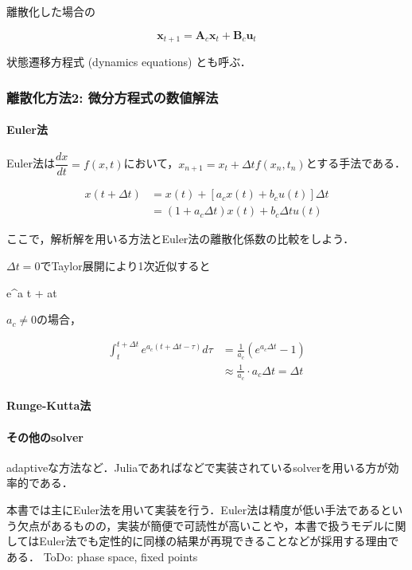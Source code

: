 離散化した場合の


\begin{equation}
\mathbf{x}_{t+1} = \mathbf{A}_c\mathbf{x}_t + \mathbf{B}_c\mathbf{u}_t
\end{equation}


状態遷移方程式 (dynamics equations) とも呼ぶ．
\subsubsection{離散化方法2: 微分方程式の数値解法}
\paragraph{Euler法}
Euler法は$\dfrac{dx}{dt}=f(x, t)$において，$x_{n+1}=x_t+\Delta t f(x_n, t_n)$とする手法である．


\begin{align}
x(t+\Delta t)&=x(t) + \left[a_c x(t)+b_c u(t) \right]\Delta t\\
&=(1+a_c \Delta t)x(t) + b_c\Delta t u(t)
\end{align}


ここで，解析解を用いる方法とEuler法の離散化係数の比較をしよう．

$\Delta t=0$でTaylor展開により1次近似すると


e^{a \Delta t}  + a\Delta t



$a_c\neq 0$の場合，


\begin{align}
\int_t^{t+\Delta t} e^{a_c(t+\Delta t-\tau)} d\tau&=\frac{1}{a_c}(e^{a_c \Delta t}-1)\\
&\approx \frac{1}{a_c}\cdot a_c \Delta t=\Delta t
\end{align}


\paragraph{Runge-Kutta法}

\paragraph{その他のsolver}
adaptiveな方法など．Juliaであればなどで実装されているsolverを用いる方が効率的である．

本書では主にEuler法を用いて実装を行う．Euler法は精度が低い手法であるという欠点があるものの，実装が簡便で可読性が高いことや，本書で扱うモデルに関してはEuler法でも定性的に同様の結果が再現できることなどが採用する理由である．
ToDo: phase space, fixed points

